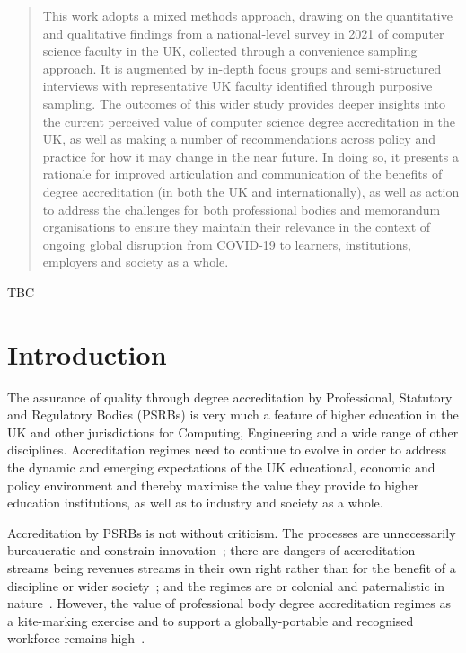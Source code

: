 \documentclass[conference]{IEEEtran}
\begin{document}
\begin{abstract}
This work adopts a mixed methods approach, drawing on the quantitative
and qualitative findings from a national-level survey in 2021 of
computer science faculty in the UK, collected through a convenience
sampling approach. It is augmented by in-depth focus groups and
semi-structured interviews with representative UK faculty identified
through purposive sampling. The outcomes of this wider study provides
deeper insights into the current perceived value of computer science
degree accreditation in the UK, as well as making a number of
recommendations across policy and practice for how it may change in
the near future. In doing so, it presents a rationale for improved
articulation and communication of the benefits of degree accreditation
(in both the UK and internationally), as well as action to address the
challenges for both professional bodies and memorandum organisations
to ensure they maintain their relevance in the context of ongoing
global disruption from COVID-19 to learners, institutions, employers
and society as a whole.
\end{abstract}

\begin{IEEEkeywords}
TBC
\end{IEEEkeywords}

\section{Introduction}
The assurance of quality through degree accreditation by Professional,
Statutory and Regulatory Bodies (PSRBs) is very much a feature of
higher education in the UK and other jurisdictions for Computing, Engineering and a wide range of other disciplines.  Accreditation regimes need to continue to evolve in order to address the  dynamic and emerging expectations of the UK educational, economic and policy environment and thereby maximise the value they provide to higher education institutions, as well as to
industry and society as a whole.

Accreditation by PSRBs is not without criticism. The processes are
unnecessarily bureaucratic and constrain innovation~\cite{Harvey2004};
 there are dangers of accreditation streams being revenues streams
in their own right rather than for the benefit of a discipline or
wider society~\cite{Knight_2015}; and the regimes are or colonial
and paternalistic in nature~\cite{Mutereko2018}. However, the value of professional body degree
accreditation regimes as a kite-marking exercise and to support
a globally-portable and recognised workforce remains high~\cite{Knight_2015}. 
\end{document}
